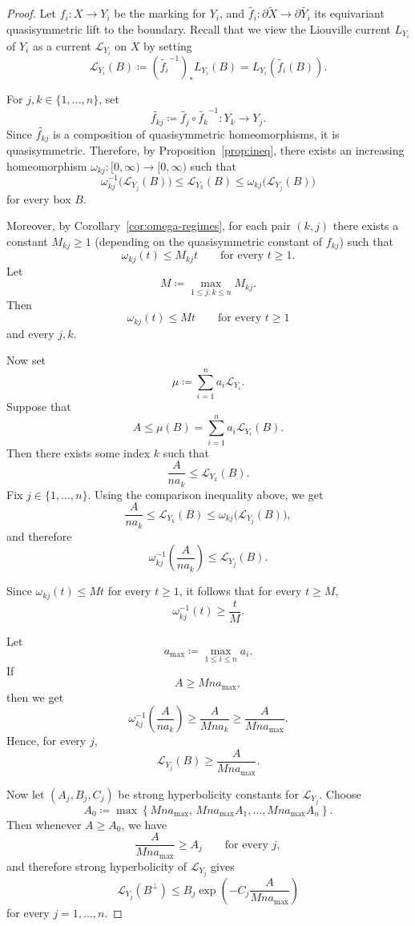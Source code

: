 \documentclass[12pt]{amsart}
\numberwithin{equation}{section}
\numberwithin{figure}{section}
\theoremstyle{definition}
\theoremstyle{plain}
\newcommand*{\wt}[1]{\widetilde{#1}}
\begin{document}
\begin{proof}
Let $f_i \colon X \to Y_i$ be the marking for $Y_i$, and $\wt{f_i} \colon \partial \wt{X} \to \partial \wt{Y_i}$ its equivariant quasisymmetric lift to the boundary. Recall that we view the Liouville current $L_{Y_i}$ of $Y_i$ as a current $\mathcal{L}_{Y_i}$ on $X$ by setting
\[
\mathcal{L}_{Y_i}(B)\coloneqq (\wt{f_i}^{-1})_*L_{Y_i}(B)=L_{Y_i}(\wt{f_i}(B)).
\]

For $j,k\in\{1,\dots,n\}$, set
\[
\wt{f_{kj}}\coloneqq \wt{f_j}\circ \wt{f_k}^{-1}\colon Y_k\to Y_j.
\]
Since $\wt{f_{kj}}$ is a composition of quasisymmetric homeomorphisms, it is quasisymmetric. Therefore, by Proposition~\ref{prop:ineq}, there exists an increasing homeomorphism $\omega_{kj}\colon [0,\infty)\to[0,\infty)$ such that
\[
\omega_{kj}^{-1}\bigl(\mathcal{L}_{Y_j}(B)\bigr)
\le
\mathcal{L}_{Y_k}(B)
\le
\omega_{kj}\bigl(\mathcal{L}_{Y_j}(B)\bigr)
\]
for every box $B$.

Moreover, by Corollary~\ref{cor:omega-regimes}, for each pair $(k,j)$ there exists a constant $M_{kj}\ge 1$ (depending on the quasisymmetric constant of $f_{kj}$) such that
\[
\omega_{kj}(t)\le M_{kj} t
\qquad\text{for every } t\ge 1.
\]
Let
\[
M\coloneqq \max_{1\le j,k\le n} M_{kj}.
\]
Then
\[
\omega_{kj}(t)\le Mt
\qquad\text{for every } t\ge 1
\]
and every $j,k$.

Now set
\[
\mu\coloneqq \sum_{i=1}^n a_i \mathcal{L}_{Y_i}.
\]
Suppose that
\[
A\le \mu(B)=\sum_{i=1}^n a_i \mathcal{L}_{Y_i}(B).
\]
Then there exists some index $k$ such that
\[
\frac{A}{n a_k}\le \mathcal{L}_{Y_k}(B).
\]
Fix $j\in\{1,\dots,n\}$. Using the comparison inequality above, we get
\[
\frac{A}{n a_k}
\le
\mathcal{L}_{Y_k}(B)
\le
\omega_{kj}\bigl(\mathcal{L}_{Y_j}(B)\bigr),
\]
and therefore
\[
\omega_{kj}^{-1}\!\left(\frac{A}{n a_k}\right)\le \mathcal{L}_{Y_j}(B).
\]

Since $\omega_{kj}(t)\le Mt$ for every $t\ge 1$, it follows that for every $t\ge M$,
\[
\omega_{kj}^{-1}(t)\ge \frac{t}{M}.
\]

Let
\[
a_{\max}\coloneqq \max_{1\le i\le n} a_i.
\]
If
\[
A\ge M n a_{\max},
\]
then we get
\[
\omega_{kj}^{-1}\!\left(\frac{A}{n a_k}\right)\ge \frac{A}{M n a_k}\ge \frac{A}{M n a_{\max}}.
\]
Hence, for every $j$,
\[
\mathcal{L}_{Y_j}(B)\ge \frac{A}{M n a_{\max}}.
\]

Now let $(A_j,B_j,C_j)$ be strong hyperbolicity constants for $\mathcal{L}_{Y_j}$. Choose
\[
A_0\coloneqq \max\!\left\{M n a_{\max},\, M n a_{\max} A_1,\dots, M n a_{\max} A_n\right\}.
\]
Then whenever $A\ge A_0$, we have
\[
\frac{A}{M n a_{\max}}\ge A_j
\qquad\text{for every } j,
\]
and therefore strong hyperbolicity of $\mathcal{L}_{Y_j}$ gives
\[
\mathcal{L}_{Y_j}(B^\perp)
\le
B_j \exp\!\left(- C_j \frac{A}{M n a_{\max}}\right)
\]
for every $j=1,\dots,n$.


\end{proof}
\end{document}
